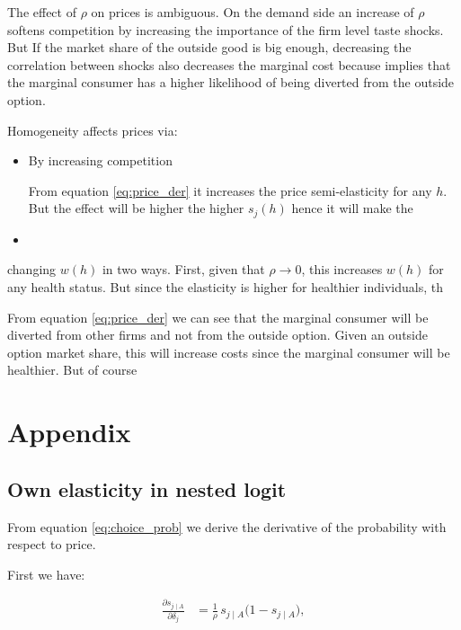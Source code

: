 \documentclass[12pt]{article}
\theoremstyle{plain}
\theoremstyle{plain}
\begin{document}
The effect of $\rho$ on prices is ambiguous. On the demand side an increase of $\rho$ softens competition by increasing the importance of the firm level taste shocks. But If the market share of the outside good is big enough, decreasing the correlation between shocks also decreases the marginal cost because implies that the marginal consumer has a higher likelihood of being diverted from the outside option. 


Homogeneity affects prices via: 
\begin{itemize}
    \item By increasing competition 
    
    
    From equation \ref{eq:price_der} it increases the price semi-elasticity for any $h$. But the effect will be higher the higher $s_j(h)$ hence it will make the 
    \item 
\end{itemize}changing $w(h)$ in two ways. First, given that $\rho \rightarrow 0$, this increases $w(h)$ for any health status. But since the elasticity is higher for healthier individuals, th



From equation \ref{eq:price_der} we can see that the marginal consumer will be diverted from other firms and not from the outside option. 
Given an outside option market share, this will increase costs since the marginal consumer will be healthier.  But of course 


 
\section{Appendix}

\subsection{Own elasticity in nested logit}\label{sec:appendix1}
From equation \ref{eq:choice_prob} we derive the derivative of the probability with respect to price. 

First we have: 

\begin{align}\label{eq:a1}
\frac{\partial s_{j\mid A}}{\partial \delta_j}
&=\frac{1}{\rho}\,s_{j\mid A}\big(1 - s_{j\mid A}\big), 
\end{align}
\end{document}
